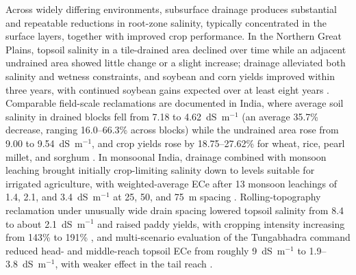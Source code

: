Across widely differing environments, subsurface drainage produces substantial and repeatable reductions in root-zone salinity, typically concentrated in the surface layers, together with improved crop performance. In the Northern Great Plains, topsoil salinity in a tile-drained area declined over time while an adjacent undrained area showed little change or a slight increase; drainage alleviated both salinity and wetness constraints, and soybean and corn yields improved within three years, with continued soybean gains expected over at least eight years \parencite{Derby2024}. Comparable field-scale reclamations are documented in India, where average soil salinity in drained blocks fell from 7.18 to 4.62~dS~m$^{-1}$ (an average 35.7\% decrease, ranging 16.0--66.3\% across blocks) while the undrained area rose from 9.00 to 9.54~dS~m$^{-1}$, and crop yields rose by 18.75--27.62\% for wheat, rice, pearl millet, and sorghum \parencite{Sharma2006}. In monsoonal India, drainage combined with monsoon leaching brought initially crop-limiting salinity down to levels suitable for irrigated agriculture, with weighted-average ECe after 13 monsoon leachings of 1.4, 2.1, and 3.4~dS~m$^{-1}$ at 25, 50, and 75~m spacing \parencite{Sharma2000}. Rolling-topography reclamation under unusually wide drain spacing lowered topsoil salinity from 8.4 to about 2.1~dS~m$^{-1}$ and raised paddy yields, with cropping intensity increasing from 143\% to 191\% \parencite{Manjunatha2004}, and multi-scenario evaluation of the Tungabhadra command reduced head- and middle-reach topsoil ECe from roughly 9~dS~m$^{-1}$ to 1.9--3.8~dS~m$^{-1}$, with weaker effect in the tail reach \parencite{Karegoudar2022}.

